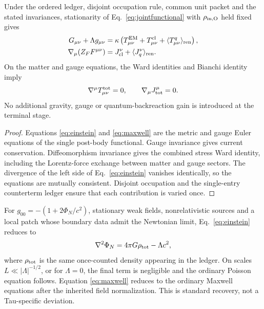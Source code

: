 \begin{theorem}
\label{thm:assembly}
Under the ordered ledger, disjoint occupation rule, common unit packet and the
stated invariances, stationarity of Eq.~\eqref{eq:jointfunctional} with
$\rho_{\rm in,O}$ held fixed gives
\begin{align}
G_{\mu\nu}+\Lambda g_{\mu\nu}
&=\kappa\left(T^{\rm EM}_{\mu\nu}+T^{\rm cl}_{\mu\nu}
+\langle T^q_{\mu\nu}\rangle_{\rm ren}\right),
\label{eq:einstein}\\
\nabla_\mu(Z_FF^{\mu\nu})
&=J_{\rm cl}^{\nu}+\langle J_q^\nu\rangle_{\rm ren}.
\label{eq:maxwell}
\end{align}
On the matter and gauge equations, the Ward identities and Bianchi identity
imply
\begin{equation}
\nabla^\mu T^{\rm tot}_{\mu\nu}=0,
\qquad
\nabla_\mu J_{\rm tot}^{\mu}=0.
\label{eq:ward}
\end{equation}
No additional gravity, gauge or quantum-backreaction gain is introduced at the
terminal stage.
\end{theorem}
\begin{proof}
Equations \eqref{eq:einstein} and \eqref{eq:maxwell} are the metric and gauge
Euler equations of the single post-body functional. Gauge invariance gives
current conservation. Diffeomorphism invariance gives the combined stress
Ward identity, including the Lorentz-force exchange between matter and gauge
sectors. The divergence of the left side of Eq.~\eqref{eq:einstein} vanishes
identically, so the equations are mutually consistent. Disjoint occupation
and the single-entry counterterm ledger ensure that each contribution is varied
once.
\end{proof}

\begin{corollary}
For $g_{00}=-(1+2\Phi_N/c^2)$, stationary weak fields, nonrelativistic
sources and a local patch whose boundary data admit the Newtonian limit,
Eq.~\eqref{eq:einstein} reduces to
\begin{equation}
\nabla^2\Phi_N=4\pi G\rho_{\rm tot}-\Lambda c^2,
\end{equation}
where $\rho_{\rm tot}$ is the same once-counted density appearing in the
ledger.  On scales $L\ll |\Lambda|^{-1/2}$, or for $\Lambda=0$, the final term
is negligible and the ordinary Poisson equation follows. Equation
\eqref{eq:maxwell} reduces to the ordinary Maxwell equations after the
inherited field normalization. This is standard recovery, not a Tau-specific
deviation.
\end{corollary}

